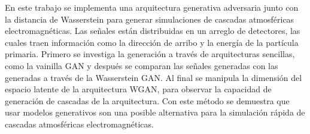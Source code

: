 \begin{extraAbstract}
En este trabajo se implementa una arquitectura generativa adversaria junto con la distancia de Wasserstein para generar simulaciones de cascadas atmosféricas electromagnéticas. Las señales están distribuidas en un arreglo de detectores, las cuales traen información como la dirección de arribo y la energía de la partícula primaria. Primero se investiga la generación a través de arquitecturas sencillas, como la vainilla GAN y después se comparan las señales generadas con las generadas a través de la Wasserstein GAN. Al final se manipula la dimensión del espacio latente de la arquitectura WGAN, para observar la capacidad de generación de cascadas de la arquitectura. Con este método se demuestra que usar modelos generativos son una posible alternativa para la simulación rápida de cascadas atmosféricas electromagnéticas. 
\end{extraAbstract}